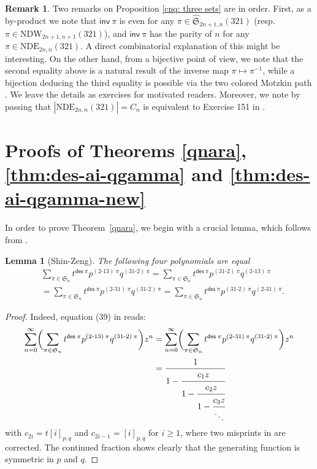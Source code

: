 \documentclass[12pt,reqno]{amsart}
\numberwithin{equation}{section}
\theoremstyle{plain}
\newtheorem{lemma}[theorem]{Lemma}
\theoremstyle{definition}
\newtheorem{remark}[theorem]{Remark}
\def\S{\mathfrak{S}}
\def\des{\mathsf{des}}
\def\inv{\mathsf{inv}}
\def\cab{31\text{-}2}
\def\bca{2\text{-}31}
\def\bac{2\text{-}13}
\begin{document}
\begin{remark}
Two remarks on Proposition \ref{cnq: three sets} are in order. First, as a by-product we note that $\inv\:\pi$ is even for any $\pi\in\widehat{\S}_{2n+1,n}(321)$ (resp. $\pi\in\textrm{NDW}_{2n+1,n+1}(321)$), and $\inv\:\pi$ has the parity of $n$ for any $\pi\in\textrm{NDE}_{2n,n}(321)$. A direct combinatorial explanation of this might be interesting. On the other hand, from a bijective point of view, we note that the second equality above is a natural result of the inverse map $\pi \mapsto \pi^{-1}$, while a bijection deducing the third equality is possible via the two colored Motzkin path \cite{Lin17,LF17}. We leave the details as exercises for motivated readers. Moreover, we note by passing that $|\text{NDE}_{2n,n}(321)|=C_n$ is equivalent to Exercise 151 in \cite{Sta2}.
\end{remark}





\section{Proofs of Theorems \ref{qnara}, \ref{thm:des-ai-qgamma} and \ref{thm:des-ai-qgamma-new}}
\label{sec3: gamma-q-nara}


In order to prove Theorem~\ref{qnara}, we begin with a crucial lemma, which follows from \cite[Eq. (39)]{SZ12}.
\begin{lemma}[Shin-Zeng]\label{SZL1} The following four polynomials are equal
\begin{align*}
&\sum_{\pi\in\S_n}t^{\des\:\pi}p^{(\bac)\:\pi}q^{(\cab)\:\pi}=\sum_{\pi\in\S_n}t^{\des\:\pi}p^{(\cab)\:\pi}q^{(\bac)\:\pi}\\
&=\sum_{\pi\in\S_n}t^{\des\:\pi}p^{(\bca)\:\pi}q^{(\cab)\:\pi}=
\sum_{\pi\in\S_n}t^{\des\:\pi}p^{(\cab)\:\pi}q^{(\bca)\:\pi}.
\end{align*}
\end{lemma}
\begin{proof} Indeed, equation (39) in \cite{SZ12} reads:
\begin{align*}
\sum_{n=0}^{\infty} \biggl(\sum_{\pi\in\S_n}t^{\des\:\pi}p^{(\bac)\:\pi}q^{(\cab)\:\pi}\biggr)z^n&=
\sum_{n=0}^{\infty}\biggl(\sum_{\pi\in\S_n}t^{\des\:\pi}p^{(\bca)\:\pi}q^{(\cab)\:\pi}\biggr)z^n\\
&=\cfrac{1}{1-\cfrac{c_1z}{1-\cfrac{c_2z}{1-\cfrac{c_3z}{\ddots}}}}
\end{align*}
with $c_{2i}=t[i]_{p,q}$ and $c_{2i-1}=[i]_{p,q}$ for $i\geq 1$, where two misprints in \cite{SZ12} are corrected.
The continued fraction shows clearly that the generating function is symmetric in $p$ and $q$.
\end{proof}
\end{document}
